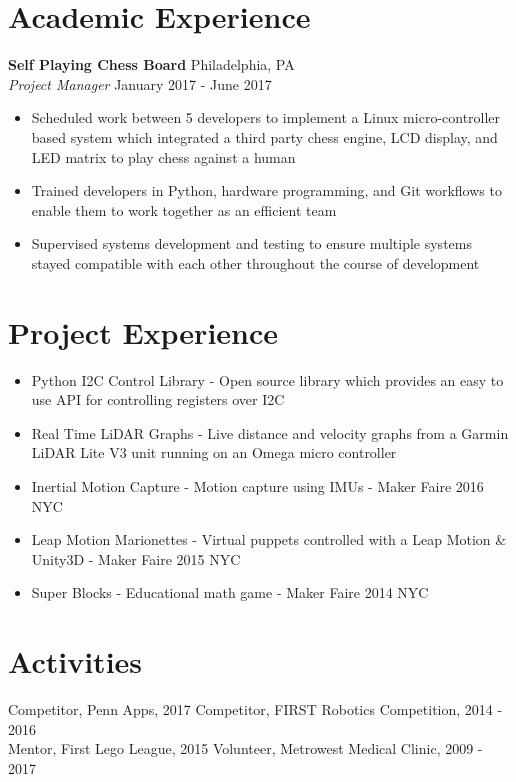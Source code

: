 \documentclass[10pt]{article}
\begin{document}
\begin{flushleft}
\section{Academic Experience}
	\textbf{Self Playing Chess Board} \hfill Philadelphia, PA \\
	\textit{Project Manager} \hfill January 2017 - June 2017 \\
	\begin{itemize}
		\item Scheduled work between 5 developers to implement a Linux 
		      micro-controller based system which integrated a third 
		      party chess engine, LCD display, and LED matrix to play 
		      chess against a human
		\item Trained developers in Python, hardware programming, and 
		      Git workflows to enable them to work together as an 
		      efficient team 
		\item Supervised systems development and testing to ensure 
		      multiple systems stayed compatible with each other 
		      throughout the course of development
	\end{itemize}

\section{Project Experience}
	\begin{itemize}
		\item Python I2C Control Library - Open source library which 
		      provides an easy to use API for controlling registers
		      over I2C
		\item Real Time LiDAR Graphs - Live distance and velocity 
		      graphs from a Garmin LiDAR Lite V3 unit running on an Omega 
		      micro controller
		\item Inertial Motion Capture - Motion capture using IMUs - 
		      Maker Faire 2016 NYC
		\item Leap Motion Marionettes - Virtual puppets controlled with 
		      a Leap Motion \& Unity3D - Maker Faire 2015 NYC
		\item Super Blocks - Educational math game - Maker Faire 2014 NYC
	\end{itemize}

\section{Activities}
	Competitor, Penn Apps, 2017 \hfill Competitor, FIRST Robotics Competition, 2014 - 2016 \\
	Mentor, First Lego League, 2015 \hfill Volunteer, Metrowest Medical Clinic, 2009 - 2017


\end{flushleft}
\end{document}
